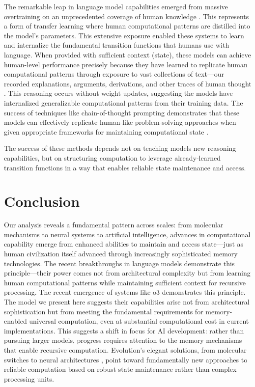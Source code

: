 \documentclass[12pt]{article}
\begin{document}
The remarkable leap in language model capabilities emerged from massive overtraining on an unprecedented coverage of human knowledge \cite{schuurmans2024autoregressive}.
This represents a form of transfer learning where human computational patterns are distilled into the model's parameters.
This extensive exposure enabled these systems to learn and internalize the fundamental transition functions that humans use with language.
When provided with sufficient context (state), these models can achieve human-level performance precisely because they have learned to replicate human computational patterns through exposure to vast collections of text---our recorded explanations, arguments, derivations, and other traces of human thought \cite{brown2020language,wei2022chain}.
This reasoning occurs without weight updates, suggesting the models have internalized generalizable computational patterns from their training data.
The success of techniques like chain-of-thought prompting demonstrates that these models can effectively replicate human-like problem-solving approaches when given appropriate frameworks for maintaining computational state \cite{wei2022emergent}.

The success of these methods depends not on teaching models new reasoning capabilities, but on structuring computation to leverage already-learned transition functions in a way that enables reliable state maintenance and access.


\section{Conclusion}

Our analysis reveals a fundamental pattern across scales: from molecular mechanisms to neural systems to artificial intelligence, advances in computational capability emerge from enhanced abilities to maintain and access state---just as human civilization itself advanced through increasingly sophisticated memory technologies.
The recent breakthroughs in language models demonstrate this principle---their power comes not from architectural complexity but from learning human computational patterns while maintaining sufficient context for recursive processing.
The recent emergence of systems like o3 \cite{guan2024deliberative} demonstrates this principle.
The model we present here suggests their capabilities arise not from architectural sophistication but from meeting the fundamental requirements for memory-enabled universal computation, even at substantial computational cost in current implementations.
This suggests a shift in focus for AI development: rather than pursuing larger models, progress requires attention to the memory mechanisms that enable recursive computation.
Evolution's elegant solutions, from molecular switches to neural architectures \cite{burrill2010making}, point toward fundamentally new approaches to reliable computation based on robust state maintenance rather than complex processing units.
\end{document}
